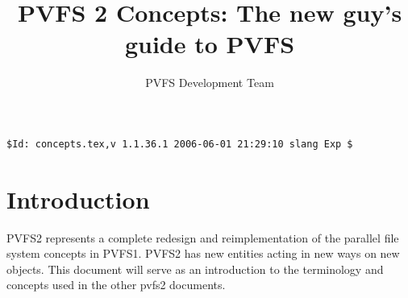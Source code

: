 \documentclass[10pt]{article} %
\title{PVFS 2 Concepts: The new guy's guide to PVFS}
\author{PVFS Development Team}
\begin{document}
\maketitle

\begin{verbatim}$Id: concepts.tex,v 1.1.36.1 2006-06-01 21:29:10 slang Exp $\end{verbatim}
\section{Introduction}

PVFS2 represents a complete redesign and reimplementation of the
parallel file system concepts in PVFS1.  PVFS2 has new entities acting
in new ways on new objects.  This document will serve as an introduction
to the terminology and concepts used in the other pvfs2 documents.

\end{document}
